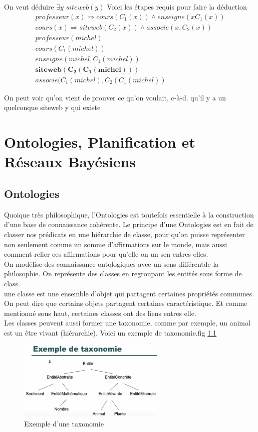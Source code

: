 \documentclass[oneside]{book}
\begin{document}
\noindent On veut déduire $\exists y$ $siteweb(y)$
\noindent Voici les étapes requis pour faire la déduction
\setcounter{equation}{0}
\begin{align}
professeur(x) \Rightarrow cours(C_1(x))\wedge enseigne(x C_1(x))\\
cours(x)\Rightarrow siteweb(C_2(x))\wedge associe(x, C_2(x))\\
professeur(michel)\\
cours(C_1(michel))\\
enseigne(michel, C_1(michel))\\
\mathbf{siteweb(C_2(C_1(michel)))}\\
associe(C_1(michel), C_2(C_1(michel))
\end{align}

On peut voir qu'on vient de prouver ce qu'on voulait, c-à-d. qu'il y a un quelconque siteweb y qui existe

\chapter{Ontologies, Planification et Réseaux Bayésiens}
\section{Ontologies}
Quoique très philosophique, l'Ontologies est toutefois essentielle à la construction d'une base de connaissance cohérente. Le principe d'une Ontologies est en fait de classer nos prédicats en une hiérarchie de classe, pour qu'on puisse représenter non seulement comme un somme d'affirmations sur le monde, mais aussi comment relier ces affirmations pour qu'elle on un sen entres-elles.\\

On modélise des connaissance ontologiques avec un sens différentde la philosophie. On représente des classes en regroupant les entités sous forme de class.\\

une classe est une ensemble d'objet qui partagent certaines propriétés communes. On peut dire que certains objets partagent certaines caractéristique. Et comme mentionné sous haut, certaines classes ont des liens entres elle.\\

Les classes peuvent aussi former une taxonomie, comme par exemple, un animal est un être vivant (hiérarchie). Voici un exemple de taxonomie.fig \ref{fig:taxonomie}
\begin{figure}[!ht]
\centering
\includegraphics[width = 7cm, keepaspectratio]{taxonomie.png}
\caption{Exemple d'une taxonomie}
\label{fig:taxonomie}
\end{figure}
\end{document}
